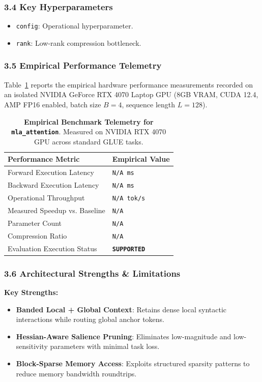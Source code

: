 \subsubsection*{3.4 Key Hyperparameters}
\begin{itemize}
    \item \texttt{config}: Operational hyperparameter.
    \item \texttt{rank}: Low-rank compression bottleneck.
\end{itemize}

\subsubsection*{3.5 Empirical Performance Telemetry}
Table~\ref{tab:telemetry_mla_attention} reports the empirical hardware performance measurements recorded on an isolated NVIDIA GeForce RTX 4070 Laptop GPU (8GB VRAM, CUDA 12.4, AMP FP16 enabled, batch size $B=4$, sequence length $L=128$).

\begin{table}[h]
\centering
\small
\caption{\textbf{Empirical Benchmark Telemetry for \texttt{mla\_attention}}. Measured on NVIDIA RTX 4070 GPU across standard GLUE tasks.}
\label{tab:telemetry_mla_attention}
\begin{tabularx}{\columnwidth}{lX}
\toprule
\textbf{Performance Metric} & \textbf{Empirical Value} \\
\midrule
Forward Execution Latency & \texttt{N/A ms} \\
Backward Execution Latency & \texttt{N/A ms} \\
Operational Throughput & \texttt{N/A tok/s} \\
Measured Speedup vs. Baseline & \texttt{N/A} \\
Parameter Count & \texttt{N/A} \\
Compression Ratio & \texttt{N/A} \\
Evaluation Execution Status & \textbf{\texttt{SUPPORTED}} \\
\bottomrule
\end{tabularx}
\end{table}

\subsubsection*{3.6 Architectural Strengths \& Limitations}
\textbf{Key Strengths:}
\begin{itemize}
    \item \textbf{Banded Local + Global Context}: Retains dense local syntactic interactions while routing global anchor tokens.
    \item \textbf{Hessian-Aware Salience Pruning}: Eliminates low-magnitude and low-sensitivity parameters with minimal task loss.
    \item \textbf{Block-Sparse Memory Access}: Exploits structured sparsity patterns to reduce memory bandwidth roundtrips.
\end{itemize}

